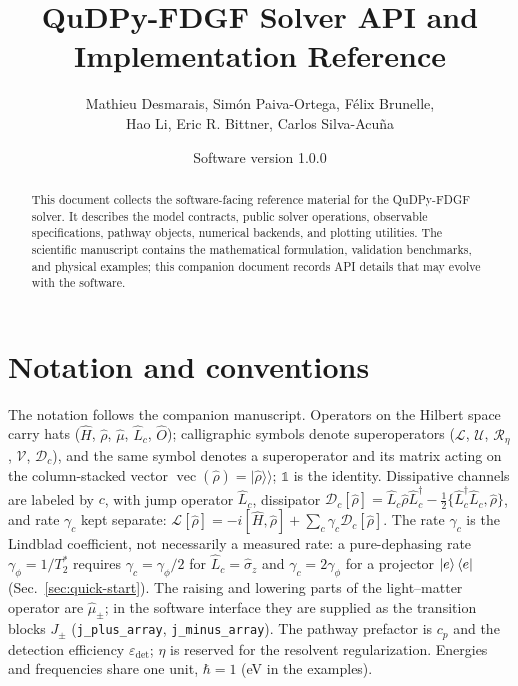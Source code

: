 \documentclass[11pt]{article}
\title{QuDPy-FDGF Solver API and Implementation Reference}
\author{Mathieu Desmarais, Sim\'on Paiva-Ortega, F\'elix Brunelle,\\ Hao Li, Eric R. Bittner, Carlos Silva-Acu\~{n}a}
\date{Software version 1.0.0}
\newcommand{\kket}[1]{|#1\rangle\!\rangle}
\begin{document}
\sloppy

\maketitle

\begin{abstract}
This document collects the software-facing reference material for the QuDPy-FDGF solver. It describes the model contracts, public solver operations, observable specifications, pathway objects, numerical backends, and plotting utilities. The scientific manuscript contains the mathematical formulation, validation benchmarks, and physical examples; this companion document records API details that may evolve with the software.
\end{abstract}

\tableofcontents
\newpage

\section*{Notation and conventions}
The notation follows the companion manuscript. Operators on the Hilbert space carry hats ($\hat{H}$, $\hat{\rho}$, $\hat\mu$, $\hat L_c$, $\hat{O}$); calligraphic symbols denote superoperators ($\mathcal{L}$, $\mathcal{U}$, $\mathcal{R}_\eta$, $\mathcal{V}$, $\mathcal{D}_c$), and the same symbol denotes a superoperator and its matrix acting on the column-stacked vector $\operatorname{vec}(\hat{\rho})=\kket{\hat{\rho}}$; $\mathbb{1}$ is the identity. Dissipative channels are labeled by $c$, with jump operator $\hat L_c$, dissipator $\mathcal{D}_c[\hat\rho]=\hat L_c\hat\rho\hat L_c^\dagger-\frac{1}{2}\{\hat L_c^\dagger\hat L_c,\hat\rho\}$, and rate $\gamma_c$ kept separate: $\mathcal{L}[\hat\rho]=-i[\hat H,\hat\rho]+\sum_c\gamma_c\mathcal{D}_c[\hat\rho]$. The rate $\gamma_c$ is the Lindblad coefficient, not necessarily a measured rate: a pure-dephasing rate $\gamma_\phi=1/T_2^*$ requires $\gamma_c=\gamma_\phi/2$ for $\hat L_c=\hat\sigma_z$ and $\gamma_c=2\gamma_\phi$ for a projector $\ket{e}\bra{e}$ (Sec.~\ref{sec:quick-start}). The raising and lowering parts of the light--matter operator are $\hat\mu_\pm$; in the software interface they are supplied as the transition blocks $J_\pm$ (\texttt{j\_plus\_array}, \texttt{j\_minus\_array}). The pathway prefactor is $c_p$ and the detection efficiency $\varepsilon_{\mathrm{det}}$; $\eta$ is reserved for the resolvent regularization. Energies and frequencies share one unit, $\hbar=1$ (eV in the examples).
\end{document}
